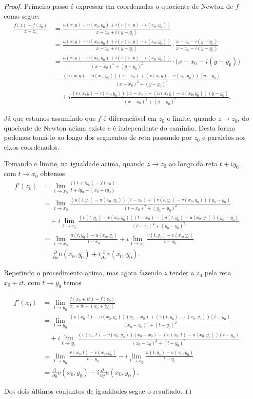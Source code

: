 \begin{proof}
Primeiro passo é expressar em coordenadas o quociente de Newton de $f$ como segue:
\begin{align*}
\frac{f(z)-f(z_0)}{z-z_0}
&=
\frac{u(x,y)-u(x_0,y_0)+i(v(x,y)-v(x_0,y_0))}{x-x_0+i(y-y_0)}
\\[0.3cm]
&=
\frac{u(x,y)-u(x_0,y_0)+i(v(x,y)-v(x_0,y_0))}{x-x_0+i(y-y_0)}\cdot \frac{x-x_0-i(y-y_0)}{x-x_0-i(y-y_0)}
\\[0.3cm]
&=
\frac{u(x,y)-u(x_0,y_0)+i(v(x,y)-v(x_0,y_0))}{(x-x_0)^2+(y-y_0)^2}\cdot\big(x-x_0-i(y-y_0)\big)
\\[0.3cm]
&=
\frac{(u(x,y)-u(x_0,y_0))(x-x_0)+(v(x,y)-v(x_0,y_0))(y-y_0)}{(x-x_0)^2+(y-y_0)^2}
\\
&\quad +i
\frac{(v(x,y)-v(x_0,y_0))(x-x_0)-(u(x,y)-u(x_0,y_0))(y-y_0)}{(x-x_0)^2+(y-y_0)^2}.
\end{align*}

Já que estamos assumindo que $f$ é diferenciável em $z_0$ o limite, quando $z\to z_0$, 
do quociente de Newton acima existe e é independente do caminho.
Desta forma podemos tomá-lo ao longo dos segmentos de reta passando por $z_0$ e paralelos aos eixos 
coordenados. 

Tomando o limite, na igualdade acima, quando $z\to z_0$ ao longo da reta $t+iy_0$, com $t\to x_0$ obtemos
\begin{align*}
f'(z_0)
&=
\lim_{t\to x_0} 
\frac{f(t+iy_0)-f(z_0)}{t+iy_0-(x_0+iy_0)}
\\[0.3cm]
&=
\lim_{t\to x_0} 
\frac{(u(t,y_0)-u(x_0,y_0))(t-x_0)+(v(t,y_0)-v(x_0,y_0))(y_0-y_0)}{(t-x_0)^2+(y_0-y_0)^2}
\\
&\quad +i \lim_{t\to x_0} 
\frac{(v(t,y_0)-v(x_0,y_0))(t-x_0)-(u(t,y_0)-u(x_0,y_0))(y_0-y_0)}{(t-x_0)^2+(y_0-y_0)^2}
\\[0.3cm]
&=
\lim_{t\to x_0} 
\frac{u(t,y_0)-u(x_0,y_0)}{t-x_0} 
+i \lim_{t\to x_0} 
\frac{v(t,y_0)-v(x_0,y_0)}{t-x_0}
\\[0.3cm]
&=
\frac{\partial }{\partial x}u(x_0,y_0) + i\frac{\partial }{\partial x}v(x_0,y_0).
\end{align*}

Repetindo o procedimento acima, mas agora fazendo $z$ tender a $z_0$ pela reta 
$x_0+it$, com $t\to y_0$ temos

\begin{align*}
f'(z_0)
&=
\lim_{t\to y_0} 
\frac{f(x_0+it)-f(z_0)}{x_0+it-(x_0+iy_0)}
\\[0.3cm]
&=
\lim_{t\to y_0} 
\frac{(u(x_0,t)-u(x_0,y_0))(x_0-x_0)+(v(t,y_0)-v(x_0,y_0))(t-y_0)}{(x_0-x_0)^2+(t-y_0)^2}
\\
&\quad +i \lim_{t\to y_0} 
\frac{(v(x_0,t)-v(x_0,y_0))(x_0-x_0)-(u(x_0,t)-u(x_0,y_0))(t-y_0)}{(x_0-x_0)^2+(t-y_0)^2}
\\[0.3cm]
&=
\lim_{t\to y_0} 
\frac{v(x_0,t)-v(x_0,y_0)}{t-y_0} 
-i \lim_{t\to x_0} 
\frac{u(t,y_0)-u(x_0,y_0)}{t-y_0}
\\[0.3cm]
&=
\frac{\partial }{\partial y}v(x_0,y_0) -i \frac{\partial }{\partial y}u(x_0,y_0).
\end{align*}

Dos dois últimos conjuntos de igualdades segue o resultado.
\end{proof}


